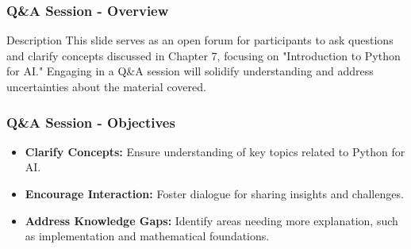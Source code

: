 \documentclass[aspectratio=169]{beamer}
\begin{document}
\begin{frame}[fragile]
    \frametitle{Q\&A Session - Overview}
    \begin{block}{Description}
        This slide serves as an open forum for participants to ask questions and clarify concepts discussed in Chapter 7, focusing on "Introduction to Python for AI." Engaging in a Q\&A session will solidify understanding and address uncertainties about the material covered.
    \end{block}
\end{frame}

\begin{frame}[fragile]
    \frametitle{Q\&A Session - Objectives}
    \begin{itemize}
        \item \textbf{Clarify Concepts:} Ensure understanding of key topics related to Python for AI.
        \item \textbf{Encourage Interaction:} Foster dialogue for sharing insights and challenges.
        \item \textbf{Address Knowledge Gaps:} Identify areas needing more explanation, such as implementation and mathematical foundations.
    \end{itemize}
\end{frame}
\end{document}
